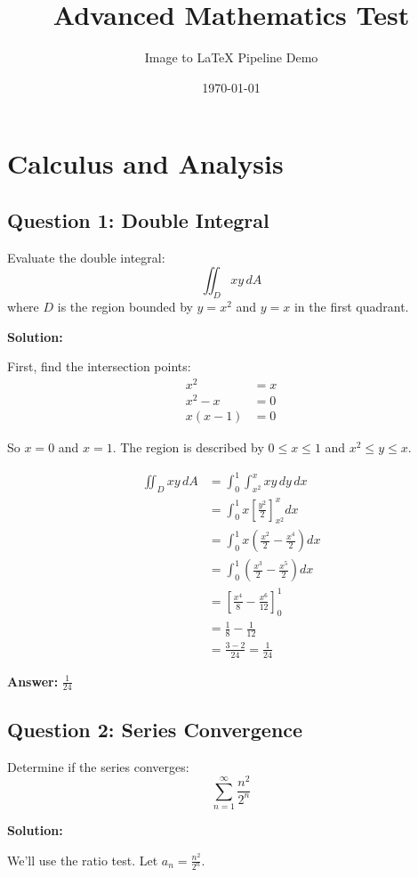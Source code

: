 \documentclass[12pt]{article}
\title{Advanced Mathematics Test}
\author{Image to LaTeX Pipeline Demo}
\date{\today}
\begin{document}
\maketitle

\section{Calculus and Analysis}

\subsection*{Question 1: Double Integral}
Evaluate the double integral:
$$\iint_D xy \, dA$$
where $D$ is the region bounded by $y = x^2$ and $y = x$ in the first quadrant.

\textbf{Solution:}

First, find the intersection points:
\begin{align*}
    x^2 &= x \\
    x^2 - x &= 0 \\
    x(x - 1) &= 0
\end{align*}

So $x = 0$ and $x = 1$. The region is described by $0 \leq x \leq 1$ and $x^2 \leq y \leq x$.

\begin{align*}
    \iint_D xy \, dA &= \int_0^1 \int_{x^2}^x xy \, dy \, dx \\
    &= \int_0^1 x \left[\frac{y^2}{2}\right]_{x^2}^x dx \\
    &= \int_0^1 x \left(\frac{x^2}{2} - \frac{x^4}{2}\right) dx \\
    &= \int_0^1 \left(\frac{x^3}{2} - \frac{x^5}{2}\right) dx \\
    &= \left[\frac{x^4}{8} - \frac{x^6}{12}\right]_0^1 \\
    &= \frac{1}{8} - \frac{1}{12} \\
    &= \frac{3 - 2}{24} = \frac{1}{24}
\end{align*}

\textbf{Answer:} $\boxed{\frac{1}{24}}$

\subsection*{Question 2: Series Convergence}
Determine if the series converges:
$$\sum_{n=1}^{\infty} \frac{n^2}{2^n}$$

\textbf{Solution:}

We'll use the ratio test. Let $a_n = \frac{n^2}{2^n}$.
\end{document}
